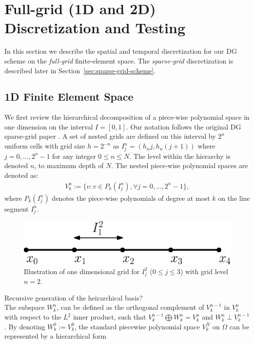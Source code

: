 \documentclass[preprint,11pt]{elsarticle}
\begin{document}
\section{Full-grid (1D and 2D) Discretization and Testing}
\label{sec:full-grid-scheme}
%
In this section we describe the spatial and temporal discretization for our DG scheme on the {\em{full-grid}} finite-element space. The {\em{sparse-grid}} discretization is described later in Section~\ref{sec:sparse-grid-scheme}.


\subsection{1D Finite Element Space}
\label{sec:1D-FE-space}
%
We first review the hierarchical decomposition of a piece-wise polynomial space in one dimension on the interval $I=[0,1]$. Our notation follows the original DG sparse-grid paper \cite{WangTangGuoCheng}. A set of nested grids are defined on this interval by $2^n$ uniform cells with grid size $h = 2^{-n}$ as $I_j^n = (h_nj,h_n(j+1))$ where $j=0,\dots,2^n-1$ for any integer $0\le n\le N$. The level within the hierarchy is denoted $n$, to maximum depth of $N$. The nested piece-wise polynomial spaces are denoted as:
%
\begin{eqnarray}
V_k^n:=\{v:v\in P_k(I_j^n),\forall j=0,\dots,2^n-1\},\label{polynomialspace}
\end{eqnarray}
where $P_k(I_j^n)$ denotes the piece-wise polynomials of degree at most $k$ on the line segment $I_j^n$.  
%
\begin{figure}[H]
\centering
\includegraphics[width=.4\textwidth]{FIGURES/Interval_1D}
\caption{Illustration of one dimensional grid for $I_j^2$ ($0\le j\le 3$) with grid level $n = 2$.}
\end{figure}
%
{\tiny\color{red} Recursive generation of the heirarchical basis?\\}
The subspace $W_k^n$, can be defined as the orthogonal complement of $V_k^{n-1}$ in $V_k^n$ with respect to the $L^2$ inner product, such that $V_k^{n-1}\bigoplus W_k^n = V_k^n$ and $W_k^n\perp V_k^{n-1}$. By denoting $W_k^0:=V_k^0$, the standard piecewise polynomial space $V_k^N$ on $\Omega$ can be represented by a hierarchical form  
\end{document}

